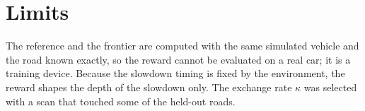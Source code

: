 \documentclass[11pt]{article}
\begin{document}
\section{Limits}

The reference and the frontier are computed with the same simulated vehicle and the road known exactly, so the reward cannot be evaluated on a real car; it is a training device. Because the slowdown timing is fixed by the environment, the reward shapes the depth of the slowdown only. The exchange rate $\kappa$ was selected with a scan that touched some of the held-out roads.
\end{document}
